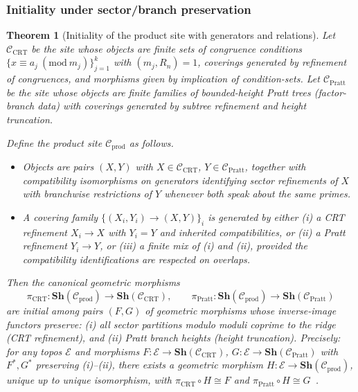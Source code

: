 \documentclass[12pt]{article}
\newtheorem{theorem}{Theorem}[section]
\numberwithin{equation}{section}
\begin{document}

\subsubsection{Initiality under sector/branch preservation}\label{subsec:B3-universal}

\begin{theorem}[Initiality of the product site with generators and relations]\label{thm:universal-morph-full}
Let $\mathscr{C}_{\mathrm{CRT}}$ be the site whose objects are finite sets of congruence conditions $\{x\equiv a_j\ (\mathrm{mod}\ m_j)\}_{j=1}^k$ with $(m_j,R_n)=1$, coverings generated by refinement of congruences, and morphisms given by implication of condition-sets. Let $\mathscr{C}_{\mathrm{Pratt}}$ be the site whose objects are finite families of bounded-height Pratt trees (factor-branch data) with coverings generated by subtree refinement and height truncation. 

Define the \emph{product site} $\mathscr{C}_{\mathrm{prod}}$ as follows.
\begin{itemize}
\item Objects are pairs $(X,Y)$ with $X\in \mathscr{C}_{\mathrm{CRT}}$, $Y\in \mathscr{C}_{\mathrm{Pratt}}$, together with compatibility isomorphisms on generators identifying sector refinements of $X$ with branchwise restrictions of $Y$ whenever both speak about the same primes.
\item A covering family $\{(X_i,Y_i)\to (X,Y)\}_i$ is generated by either (i) a CRT refinement $X_i\to X$ with $Y_i=Y$ and inherited compatibilities, or (ii) a Pratt refinement $Y_i\to Y$, or (iii) a finite mix of (i) and (ii), provided the compatibility identifications are respected on overlaps.
\end{itemize}
Then the canonical geometric morphisms 
\[
\pi_{\mathrm{CRT}}:\mathbf{Sh}(\mathscr{C}_{\mathrm{prod}})\to \mathbf{Sh}(\mathscr{C}_{\mathrm{CRT}}),\qquad
\pi_{\mathrm{Pratt}}:\mathbf{Sh}(\mathscr{C}_{\mathrm{prod}})\to \mathbf{Sh}(\mathscr{C}_{\mathrm{Pratt}})
\]
are \emph{initial} among pairs $(F,G)$ of geometric morphisms whose inverse-image functors preserve: (i) all sector partitions modulo moduli coprime to the ridge (CRT refinement), and (ii) Pratt branch heights (height truncation). Precisely: for any topos $\mathcal{E}$ and morphisms $F:\mathcal{E}\to \mathbf{Sh}(\mathscr{C}_{\mathrm{CRT}})$, $G:\mathcal{E}\to \mathbf{Sh}(\mathscr{C}_{\mathrm{Pratt}})$ with $F^\ast,G^\ast$ preserving (i)–(ii), there exists a geometric morphism $H:\mathcal{E}\to \mathbf{Sh}(\mathscr{C}_{\mathrm{prod}})$, unique up to unique isomorphism, with $\pi_{\mathrm{CRT}}\circ H\cong F$ and $\pi_{\mathrm{Pratt}}\circ H\cong G$~\cite{SpivackUGPFormalization,ugp-lean}.
\end{theorem}
\end{document}
